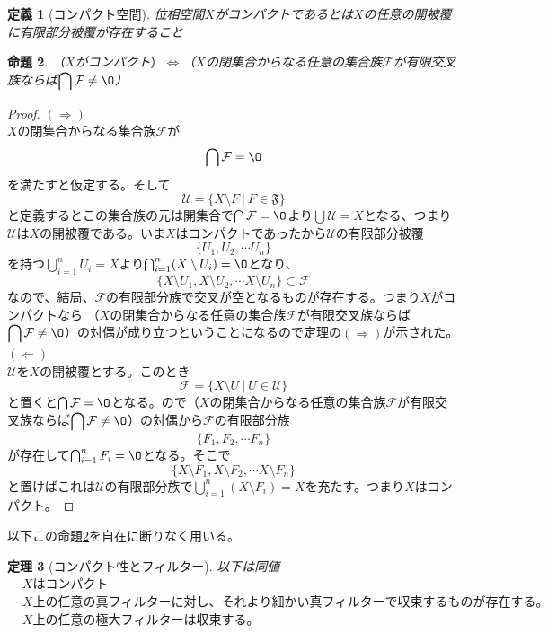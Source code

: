 \documentclass[leqno]{jsarticle}
\newtheorem{thm}{定理}
\newtheorem{prop}[thm]{命題}
\newtheorem{df}[thm]{定義}
\newcommand{\To}{\Longrightarrow}
\newcommand{\Gets}{\Longleftarrow}
\newcommand{\dpst}{\displaystyle}
\newcommand{\ff}{\mathfrak{F}}
\newcommand{\fff}{\mathcal{F}}
\begin{document}
\begin{df}[コンパクト空間]
位相空間$X$がコンパクトであるとは$X$の任意の開被覆に有限部分被覆が存在すること
\end{df}
\newcommand{\uu}{\mathcal{U}}
\begin{prop}\label{cpt}
（$X$がコンパクト$）\iff$（$X$の閉集合からなる任意の集合族$\fff$が有限交叉族ならば$\dpst \bigcap\fff\neq \O$）
\end{prop}
\begin{proof}
$(\To)$${}$\\ 
$X$の閉集合からなる集合族$\fff$が
\[
\bigcap\fff=\O
\]
を満たすと仮定する。そして
\[
\uu=\{X\setminus F\ |\ F\in \ff\}
\]
と定義するとこの集合族の元は開集合で$\bigcap\fff=\O$より$\bigcup\uu=X$となる、つまり$\uu$は$X$の開被覆である。いま$X$はコンパクトであったから$\uu$の有限部分被覆
\[
\{U_1,U_2,\cdots U_n\}
\]
を持つ$\bigcup_{i=1}^nU_i=X$より$\bigcap_{i=1}^n(X\setminus U_i)=\O$となり、
\[
\{X\setminus U_1,X\setminus U_2,\cdots X\setminus U_n\}\subset \fff
\]なので、結局、$\fff$の有限部分族で交叉が空となるものが存在する。つまり$X$がコンパクトなら
（$X$の閉集合からなる任意の集合族$\fff$が有限交叉族ならば$\dpst \bigcap\fff\neq \O$）の対偶が成り立つということになるので定理の$(\To)$が示された。\\ 
$(\Gets)$\\ 
$\uu$を$X$の開被覆とする。このとき
\[
\fff=\{X\setminus U\ |\ U\in \uu\}
\]
と置くと$\bigcap\fff=\O$となる。ので（$X$の閉集合からなる任意の集合族$\fff$が有限交叉族ならば$\dpst \bigcap\fff\neq \O$）の対偶から$\fff$の有限部分族
\[
\{F_1,F_2,\cdots F_n\}
\]
が存在して$\bigcap_{i=1}^nF_i=\O$となる。そこで
\[
\{X\setminus F_1,X\setminus F_2,\cdots X\setminus F_n\}
\]
と置けばこれは$\uu$の有限部分族で$\bigcup_{i=1}^n(X\setminus F_i)=X$を充たす。つまり$X$はコンパクト。
\end{proof}
以下この命題\ref{cpt}を自在に断りなく用いる。
	\setcounter{equation}{0}
\begin{thm}[コンパクト性とフィルター]\label{aaa}
以下は同値
\begin{eqnarray}
&Xはコンパクト\\ 
&X上の任意の真フィルターに対し、それより細かい真フィルターで収束するものが存在する。\\
&X上の任意の極大フィルターは収束する。
\end{eqnarray}
\end{thm}
\end{document}
